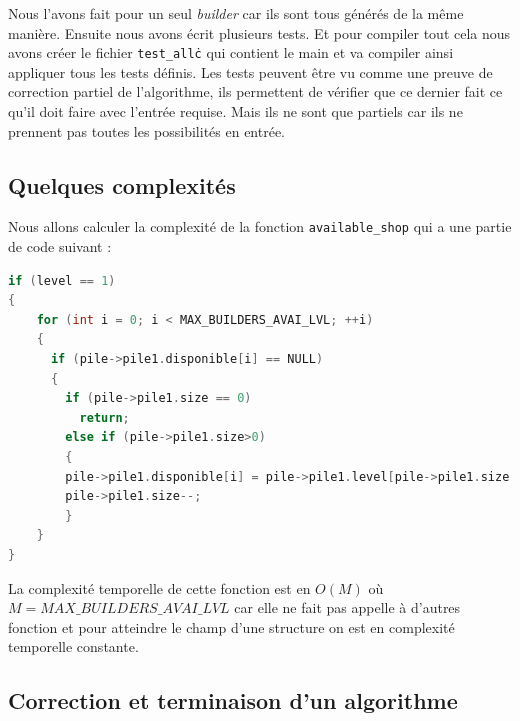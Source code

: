\documentclass{article}
\begin{document}
\vspace{1cm} Nous l'avons fait pour un seul \emph{builder} car ils sont tous générés de la même manière. Ensuite nous avons écrit plusieurs tests. Et pour compiler tout cela nous avons créer le fichier \texttt{test\_all\.c} qui contient le main et va compiler ainsi appliquer tous les tests définis. Les tests peuvent être vu comme une preuve de correction partiel de l'algorithme, ils permettent de vérifier que ce dernier fait ce qu'il doit faire avec l'entrée requise. Mais ils ne sont que partiels car ils ne prennent pas toutes les possibilités en entrée. 

\subsection{Quelques complexités} 
\hspace{1em} Nous allons calculer la complexité de la fonction \texttt{available\_shop} qui a une partie de code suivant :


\begin{tcolorbox}[colback=gray!10,colframe=white!75!black]
\begin{lstlisting}[language=C, caption={Partie available\_builder},label={lst:exemple12-c}]
if (level == 1)
{
    for (int i = 0; i < MAX_BUILDERS_AVAI_LVL; ++i)
    {
      if (pile->pile1.disponible[i] == NULL)
      {
        if (pile->pile1.size == 0)
          return;
        else if (pile->pile1.size>0)
        {
        pile->pile1.disponible[i] = pile->pile1.level[pile->pile1.size - 1];
        pile->pile1.size--;
        }
    }
}
\end{lstlisting}
\end{tcolorbox}

La complexité temporelle de cette fonction est en $O(M)$ où $M=MAX\_BUILDERS\_AVAI\_LVL$ car elle ne fait pas appelle à d'autres fonction et pour atteindre le champ d'une structure on est en complexité temporelle constante. 



\subsection{Correction et terminaison d'un algorithme}
\end{document}
